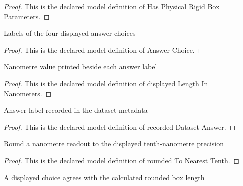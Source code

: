 \begin{proof}
  This is the declared model definition of Has Physical Rigid Box Parameters.
\end{proof}
\begin{definition}
  \label{def:physics:phyx-mini-0656:phyxminiproblems-problemphyxmini0656-answerchoice}
  Labels of the four displayed answer choices
\end{definition}
\begin{proof}
  This is the declared model definition of Answer Choice.
\end{proof}
\begin{definition}
  \label{def:physics:phyx-mini-0656:phyxminiproblems-problemphyxmini0656-displayedlengthinnanometers}
  Nanometre value printed beside each answer label
\end{definition}
\begin{proof}
  This is the declared model definition of displayed Length In Nanometers.
\end{proof}
\begin{definition}
  \label{def:physics:phyx-mini-0656:phyxminiproblems-problemphyxmini0656-recordeddatasetanswer}
  Answer label recorded in the dataset metadata
\end{definition}
\begin{proof}
  This is the declared model definition of recorded Dataset Answer.
\end{proof}
\begin{definition}
  \label{def:physics:phyx-mini-0656:phyxminiproblems-problemphyxmini0656-roundedtonearesttenth}
  Round a nanometre readout to the displayed tenth-nanometre precision
\end{definition}
\begin{proof}
  This is the declared model definition of rounded To Nearest Tenth.
\end{proof}
\begin{definition}
  \label{def:physics:phyx-mini-0656:phyxminiproblems-problemphyxmini0656-matchesdisplayedlength}
  A displayed choice agrees with the calculated rounded box length
\end{definition}
